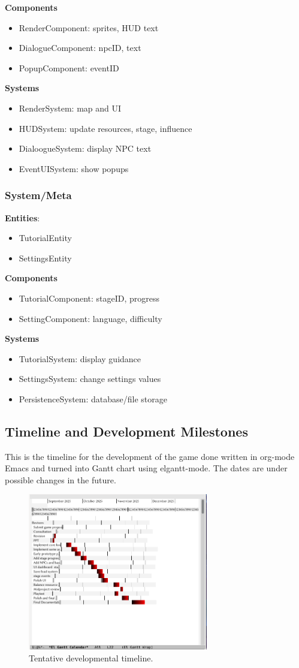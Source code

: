 \documentclass[11pt]{article}
\begin{document}
\textbf{Components}
\begin{itemize}
\item
  RenderComponent: sprites, HUD text
\item
  DialogueComponent: npcID, text
\item
  PopupComponent: eventID
\end{itemize}

\textbf{Systems}
\begin{itemize}
\item
  RenderSystem: map and UI
\item
  HUDSystem: update resources, stage, influence
\item
  DialoogueSystem: display NPC text
\item
  EventUISystem: show popups
\end{itemize}

\subsubsection{System/Meta}
\textbf{Entities}:
\begin{itemize}
\item
  TutorialEntity
\item
  SettingsEntity
\end{itemize}

\textbf{Components}
\begin{itemize}
\item
  TutorialComponent: stageID, progress
\item
  SettingComponent: language, difficulty
\end{itemize}

\textbf{Systems}
\begin{itemize}
\item
  TutorialSystem: display guidance
\item
  SettingsSystem: change settings values
\item
  PersistenceSystem: database/file storage
\end{itemize}


\subsection{Timeline and Development Milestones}
This is the timeline for the development of the game done written in org-mode Emacs and turned into Gantt chart using elgantt-mode. The dates are under possible changes in the future.\\

\begin{figure}[H]
  \centering
  \includegraphics[width=0.7\textwidth]{images/elgantt.png}
  \caption{Tentative developmental timeline.}
  \label{fig:gantt}
\end{figure}
\end{document}
